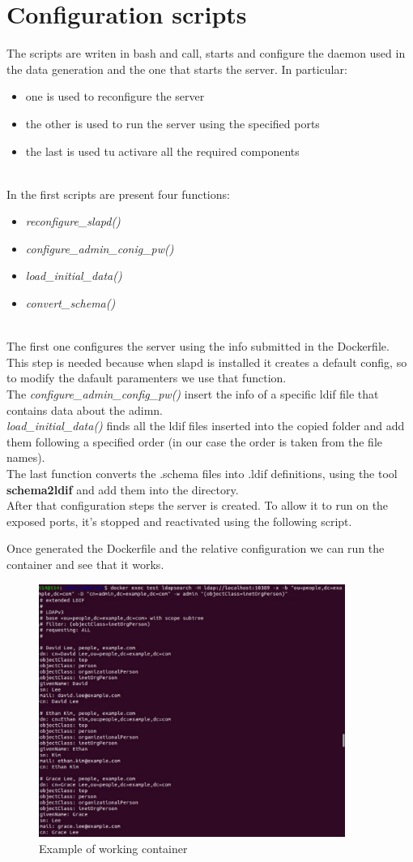 \section{Configuration scripts}
The scripts are writen in bash and call, starts and configure the daemon used in the data generation and the one that starts the server. In particular:
\begin{itemize}
    \item one is used to reconfigure the server
    \item the other is used to run the server using the specified ports
    \item the last is used tu activare all the required components
\end{itemize}
\\
In the first scripts are present four functions:\\
\begin{itemize}
    \item \textit{reconfigure\_slapd()}
    \item \textit{configure\_admin\_conig\_pw()}
    \item \textit{load\_initial\_data()}
    \item \textit{convert\_schema()}
\end{itemize}
\\
The first one configures the server using the info submitted in the Dockerfile. This step is needed because when slapd is installed it creates a default config, so to modify the dafault paramenters we use that function.
\\
The \textit{configure\_admin\_config\_pw()} insert the info of a specific ldif file that contains data about the adimn.
\\
\textit{load\_initial\_data()} finds all the ldif files inserted into the copied folder and add them following a specified order (in our case the order is taken from the file names).
\\
The last function converts the .schema files into .ldif definitions, using the tool \textbf{schema2ldif} \cite{schema2ldif} and add them into the directory.
\\
After that configuration steps the server is created. To allow it to run on the exposed ports, it's stopped and reactivated using the following script.
\begin{mdframed}[backgroundcolor=back]

\end{mdframed}
Once generated the Dockerfile and the relative configuration we can run the container and see that it works.
\begin{figure}[h]
    \caption{Example of working container}
    \centering
    \includegraphics[width=10cm]{img/search.jpg}
\end{figure}
